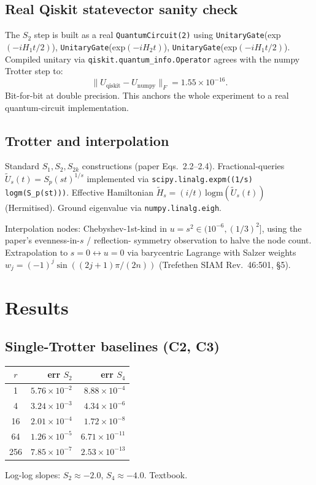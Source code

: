 \documentclass[11pt]{article}
\begin{document}
\subsection{Real Qiskit statevector sanity check}
The $S_2$ step is built as a real \texttt{QuantumCircuit(2)} using
\texttt{UnitaryGate}(exp$(-iH_1 t/2)$), \texttt{UnitaryGate}(exp$(-iH_2
t)$), \texttt{UnitaryGate}(exp$(-iH_1 t/2)$). Compiled unitary via
\texttt{qiskit.quantum\_info.Operator} agrees with the numpy Trotter
step to:
\begin{equation}
\|U_{\text{qiskit}} - U_{\text{numpy}}\|_F = 1.55\times 10^{-16}.
\end{equation}
Bit-for-bit at double precision. This anchors the whole experiment to a
real quantum-circuit implementation.

\subsection{Trotter and interpolation}
Standard $S_1, S_2, S_{2k}$ constructions (paper Eqs.\ 2.2--2.4).
Fractional-queries $\tilde U_s(t) = S_p(st)^{1/s}$ implemented via
\texttt{scipy.linalg.expm((1/s)\,logm(S\_p(st)))}. Effective Hamiltonian
$\tilde H_s = (i/t)\,\mathrm{logm}(\tilde U_s(t))$ (Hermitised). Ground
eigenvalue via \texttt{numpy.linalg.eigh}.

Interpolation nodes: Chebyshev-1st-kind in $u = s^2 \in
(10^{-6}, (1/3)^2]$, using the paper's evenness-in-$s$ / reflection-
symmetry observation to halve the node count. Extrapolation to
$s=0 \leftrightarrow u=0$ via barycentric Lagrange with Salzer weights
$w_j = (-1)^j \sin((2j+1)\pi/(2n))$ (Trefethen SIAM Rev.\ 46:501, \S 5).

\section{Results}
\subsection{Single-Trotter baselines (C2, C3)}
\begin{table}[h]
\centering
\begin{tabular}{crr}
\toprule
$r$ & err $S_2$ & err $S_4$ \\
\midrule
1  & $5.76\!\times\!10^{-2}$ & $8.88\!\times\!10^{-4}$ \\
4  & $3.24\!\times\!10^{-3}$ & $4.34\!\times\!10^{-6}$ \\
16 & $2.01\!\times\!10^{-4}$ & $1.72\!\times\!10^{-8}$ \\
64 & $1.26\!\times\!10^{-5}$ & $6.71\!\times\!10^{-11}$ \\
256& $7.85\!\times\!10^{-7}$ & $2.53\!\times\!10^{-13}$ \\
\bottomrule
\end{tabular}
\end{table}
Log-log slopes: $S_2 \approx -2.0$, $S_4 \approx -4.0$. Textbook.
\end{document}
